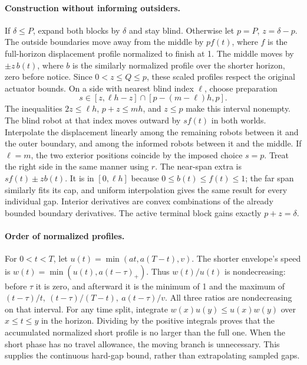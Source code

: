 \documentclass[11pt]{article}
\begin{document}
\paragraph{Construction without informing outsiders.}
If \(\delta\le P\), expand both blocks by \(\delta\) and stay
blind. Otherwise let \(p=P\), \(z=\delta-p\). The outside
boundaries move away from the middle by \(p f(t)\), where
\(f\) is the full-horizon displacement profile normalized to
finish at 1. The middle moves by \(\pm z\,b(t)\), where \(b\)
is the similarly normalized profile over the shorter horizon,
zero before notice. Since \(0<z\le Q\le p\), these scaled
profiles respect the original actuator bounds. On a side
with nearest blind index \(\ell\), choose preparation
\[
            s\in[z,\ell h-z]\cap[p-(m-\ell)h,p] .
\]
The inequalities \(2z\le\ell h\), \(p+z\le mh\), and
\(z\le p\) make this interval nonempty. The blind robot
at that index moves outward by \(s f(t)\) in both worlds.
Interpolate the displacement linearly among the remaining
robots between it and the outer boundary, and among the
informed robots between it and the middle. If \(\ell=m\),
the two exterior positions coincide by the imposed choice
\(s=p\). Treat the right side in the same manner using \(r\).
The near-span extra is \(s f(t)\pm z b(t)\).
It is in \([0,\ell h]\) because \(0\le b(t)\le f(t)\le1\);
the far span similarly fits its cap, and uniform
interpolation gives the same result for every individual
gap. Interior derivatives are convex combinations of
the already bounded boundary derivatives. The active
terminal block gains exactly \(p+z=\delta\).

\paragraph{Order of normalized profiles.}
For \(0<t<T\), let \(u(t)=\min(at,a(T-t),v)\).
The shorter envelope's speed is
\(w(t)=\min(u(t),a(t-\tau)_+)\).
Thus \(w(t)/u(t)\) is nondecreasing: before \(\tau\) it is
zero, and afterward it is the minimum of 1 and the maximum
of \((t-\tau)/t,\ (t-\tau)/(T-t),\ a(t-\tau)/v\).
All three ratios are nondecreasing on that interval.
For any time split, integrate \(w(x)u(y)\le u(x)w(y)\)
 over \(x\le t\le y\) in the horizon. Dividing by the
positive integrals proves that the accumulated normalized
short profile is no larger than the full one. When the
short phase has no travel allowance, the moving branch
is unnecessary. This supplies the continuous hard-gap
bound, rather than extrapolating sampled gaps.
\end{document}
